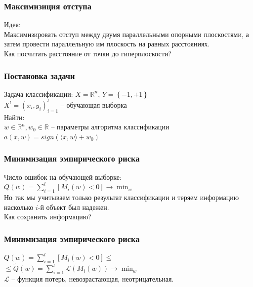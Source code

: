 \documentclass[12pt]{beamer}
\begin{document}
\begin{frame}\frametitle{Максимизиция отступа}
Идея:\\
Максимизировать отступ между
двумя параллельными опорными плоскостями, а затем
провести параллельную им плоскость на равных расстояниях.\\
\vspace{5mm}
Как посчитать расстояние от точки до гиперплоскости?
\end{frame}

\begin{frame}\frametitle{Постановка задачи}
Задача классификации:
$X = \mathbb{R}^n$, ${Y = \left\{ -1, +1\right\}}$\\
${X^l = (x_i, y_i)_{i = 1}^l}$ -- обучающая выборка\\
\vspace{5mm}
Найти:\\
$w \in \mathbb{R}^n, w_0 \in \mathbb{R}$ -- параметры алгоритма классификации\\
${a(x, w) = sign(\langle x, w\rangle + w_0) }$
\end{frame}

\begin{frame}\frametitle{Минимизация эмпирического риска}
Число ошибок на обучающей выборке:\\
\vspace{5mm}
${Q(w) = \sum_{i=1}^l \left[ M_i(w) < 0 \right] \rightarrow \min_w }$\\
\vspace{3mm}
Но так мы учитываем только результат классификации и теряем информацию насколько ${i}$-й объект был надежен.\\
\vspace{3mm}
Как сохранить информацию?

\end{frame}

\begin{frame}\frametitle{Минимизация эмпирического риска}
${Q(w) = \sum_{i=1}^l \left[ M_i(w) < 0 \right] \leq}$\\ \vspace{3mm}
${\leq \widetilde{Q}(w) = \sum_{i=1}^l \mathcal{L}(M_i(w)) \rightarrow \min_w }$\\\vspace{3mm}
$\mathcal{L}$ -- функция потерь, невозрастающая, неотрицательная.\\ 
\end{frame}
\end{document}
